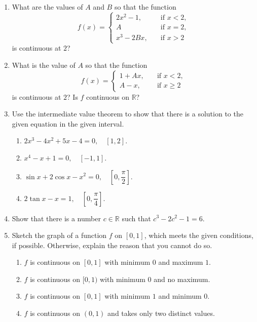 \documentclass[11pt]{book}
\theoremstyle{break}
\theoremstyle{no_label}
\newcommand{\bbR}{\mathbb{R}}
\numberwithin{equation}{section}
\begin{document}
\begin{enumerate}[label=\arabic*.]
$$\begin{array}{rl}
        A^2x^2, \quad & \text{if $x\leq2$},\\
        (1-A)x, \quad & \text{if $x>2$}
    \end{array}\right.$$ is continuous at $2$?
    \item What are the values of $A$ and $B$ so that the function $$f(x)=\left\{\begin{array}{rl}
        2x^2-1, \quad & \text{if $x<2$},\\
        A \quad &\text{if $x=2$},\\
        x^3-2Bx, \quad & \text{if $x>2$}
    \end{array}\right.$$ is continuous at $2$?
    \item What is the value of $A$ so that the function $$f(x)=\left\{\begin{array}{rl}
        1+Ax, \quad & \text{if $x<2$},\\
        A-x, \quad & \text{if $x\geq2$}
    \end{array}\right.$$ is continuous at $2$? Is $f$ continuous on $\bbR$?
    \item Use the intermediate value theorem to show that there is a solution to the given equation in the given interval. 
    \begin{enumerate} \setlength{\delimitershortfall}{0pt}
        \item $2x^3-4x^2+5x-4=0, \quad [1, 2]$.
        \item $x^4-x+1=0, \quad [-1, 1]$.
        \item $\sin x+2\cos x-x^2=0, \quad \left[0, \dfrac{\pi}{2}\right]$.
        \item $2\tan x-x=1,\quad \left[0, \dfrac{\pi}{4}\right]$.
    \end{enumerate} \setlength{\delimitershortfall}{13.5pt}
    \item Show that there is a number $c\in\bbR$ such that $c^3-2c^2-1=6$.
    \item Sketch the graph of a function $f$ on $[0, 1]$, which meets the given conditions, if possible. Otherwise, explain the reason that you cannot do so.
    \begin{enumerate}
        \item $f$ is continuous on $[0, 1]$ with minimum $0$ and maximum $1$.
        \item $f$ is continuous on $[0, 1)$ with minimum $0$ and no maximum.
        \item $f$ is continuous on $[0, 1]$ with minimum $1$ and minimum $0$.
        \item $f$ is continuous on $(0, 1)$ and takes only two distinct values.

\end{enumerate}
\end{enumerate}
\end{document}
